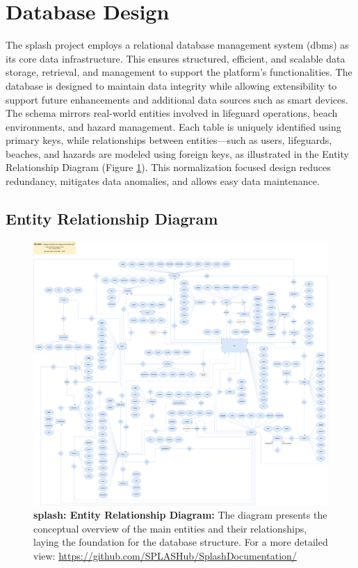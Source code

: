 \section{Database Design}
\label{section:dbdesign}

The \ac{splash} project employs a relational database management system (\ac{dbms}) as its core data infrastructure. This ensures structured, efficient, and scalable data storage, retrieval, and management to support the platform’s functionalities. The database is designed to maintain data integrity while allowing extensibility to support future enhancements and additional data sources such as smart devices. \\
The schema mirrors real-world entities involved in lifeguard operations, beach environments, and hazard management. Each table is uniquely identified using primary keys, while relationships between entities—such as users, lifeguards, beaches, and hazards are modeled using foreign keys, as illustrated in the Entity Relationship Diagram (Figure \ref{fig:DER}). This normalization focused design reduces redundancy, mitigates data anomalies, and allows easy data maintenance.

\subsection{Entity Relationship Diagram}
\label{subsection:DER}

\begin{figure}[H]
    \centering
    \includegraphics[width=16cm]{figs/DER.png}
    \caption{ \textbf{\ac{splash}: Entity Relationship Diagram:} The diagram presents the conceptual overview of the main entities and their relationships, laying the foundation for the database structure. For a more detailed view: 
    \url{https://github.com/SPLASHub/SplashDocumentation/}}
    \label{fig:DER}
\end{figure}

